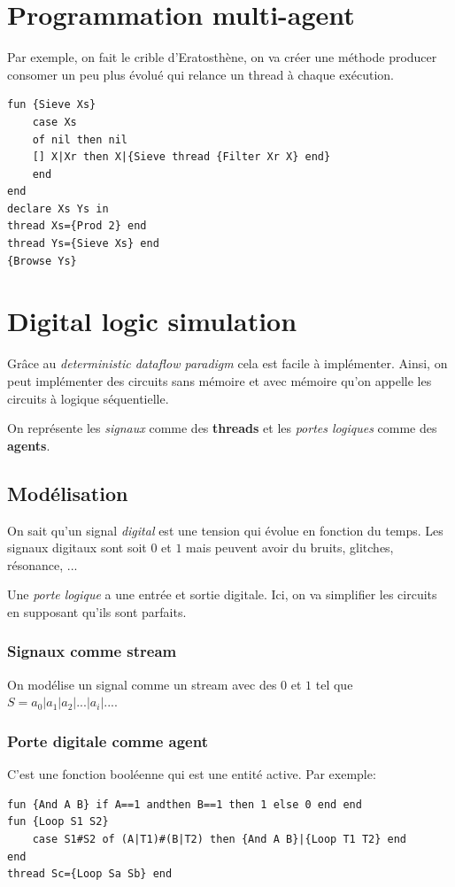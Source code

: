 \documentclass{report}
\begin{document}
\section{Programmation multi-agent}
Par exemple, on fait le crible d'Eratosthène, on va créer une méthode producer consomer un peu plus évolué qui relance un thread à chaque exécution. 
\begin{lstlisting}[escapechar=\%]
fun {Sieve Xs}
	case Xs
	of nil then nil
	[] X|Xr then X|{Sieve thread {Filter Xr X} end} 
	end
end 
declare Xs Ys in
thread Xs={Prod 2} end 
thread Ys={Sieve Xs} end
{Browse Ys}
\end{lstlisting}

\section{Digital logic simulation}
Grâce au \textit{deterministic dataflow paradigm} cela est facile à implémenter. Ainsi, on peut implémenter des circuits sans mémoire et avec mémoire qu'on appelle les circuits à logique séquentielle.\par
On représente les \textit{signaux} comme des \textbf{threads} et les \textit{portes logiques} comme des \textbf{agents}.

\subsection{Modélisation}
On sait qu'un signal \textit{digital} est une tension qui évolue en fonction du temps. Les signaux digitaux sont soit $0$ et $1$ mais peuvent avoir du bruits, glitches, résonance, ...\par
Une \textit{porte logique} a une entrée et sortie digitale. Ici, on va simplifier les circuits en supposant qu'ils sont parfaits.

\subsubsection{Signaux comme stream}
On modélise un signal comme un stream avec des $0$ et $1$ tel que $S=a_0 | a_1 | a_2 | ... | a_i | ...$.

\subsubsection{Porte digitale comme agent}
C'est une fonction booléenne qui est une entité active. Par exemple:
\begin{lstlisting}[escapechar=\%]
fun {And A B} if A==1 andthen B==1 then 1 else 0 end end 
fun {Loop S1 S2} 
	case S1#S2 of (A|T1)#(B|T2) then {And A B}|{Loop T1 T2} end
end
thread Sc={Loop Sa Sb} end
\end{lstlisting}
\end{document}
